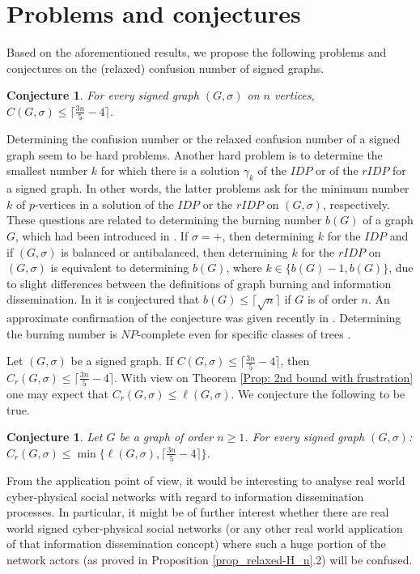 \documentclass[a4paper,11pt]{article}
\newtheorem{con}[defi]{Conjecture}
\theoremstyle{remark}
\begin{document}
\section{Problems and conjectures} \label{Sec: Problems}

Based on the aforementioned results, 
we propose the following problems and conjectures on the (relaxed)
confusion number of signed graphs. 

\begin{con} \label{Conj: bound_strong} 
For every signed graph $(G,\sigma)$ on $n$ vertices, $C(G,\sigma) \leq \lceil \frac{3n}{5}-4 \rceil$.   
\end{con}

Determining the confusion number or the relaxed confusion number of a 
signed graph seem to be hard problems. 
Another hard problem is to determine the smallest number $k$ 
for which there is a solution $\gamma_k$ of the $IDP$ or of the $rIDP$
for a signed graph. 
In other words, the latter problems ask for the minimum number $k$ of 
 $p$-vertices in a solution of the $IDP$ or the $rIDP$ 
on $(G,\sigma)$, respectively.
These questions are related to determining the burning
number $b(G)$ of a graph $G$, which had been introduced in \cite{bonato2014burning}. If $\sigma = \textbf{+}$, then 
determining $k$ for the $IDP$ and if $(G,\sigma)$ is balanced or antibalanced, then determining $k$ for 
the $rIDP$ on $(G,\sigma)$ is equivalent to determining $b(G)$, where $k \in \{b(G)-1, b(G)\}$, due to slight differences between the definitions of graph burning and information dissemination.
In \cite{bonato2016burn} it is conjectured that $b(G) \leq \lceil \sqrt{n} \rceil$ if $G$ is of order $n$. An approximate confirmation of the conjecture was given recently in \cite{norin2022burning}. Determining the burning number is $NP$-complete even for specific classes of trees \cite{hiller2020burning}. 

Let $(G,\sigma)$ be a signed graph. 
If $C(G,\sigma) \leq \lceil \frac{3n}{5}-4 \rceil$, then 
$C_r(G,\sigma) \leq \lceil \frac{3n}{5}-4 \rceil$.
With view on Theorem \ref{Prop: 2nd bound with frustration} 
one may expect that $C_r(G,\sigma) \leq \ell(G,\sigma)$. 
We conjecture the following to be true. 

\begin{con} Let $G$ be a graph of order $n \geq 1$. 
For every signed graph $(G,\sigma)$: 
$C_r(G,\sigma) \leq \min \{\ell(G,\sigma), \lceil \frac{3n}{5}-4 \rceil \}$.
\end{con}

From the application point of view, it would be interesting to analyse real world cyber-physical social networks with regard to information dissemination processes. In particular, 
it might be of further interest whether there are real world signed 
cyber-physical social networks (or any other real world application of that
information dissemination concept) where such a huge portion of the network actors 
(as proved in Proposition \ref{prop_relaxed-H_n}.2) will be confused. 


{}

\end{document}
